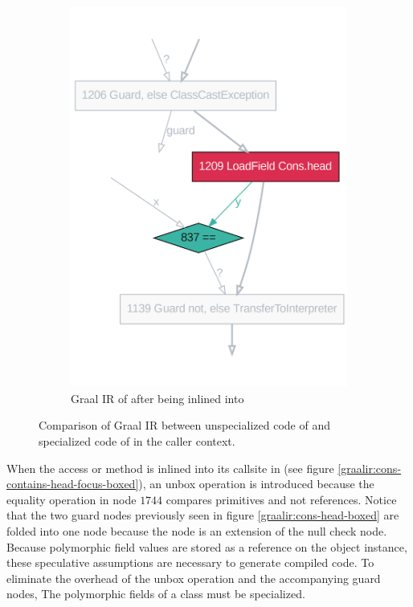 \begin{figure}[!htb]
\begin{subfigure}[b]{0.4\textwidth}
		\includegraphics[width=\textwidth]{figures/dot/List.contains.specialized.TruffleTier.png}
		\caption{Graal IR of  after being inlined into }
		\label{graalir:cons-contains-head-focus-specialized}
	\end{subfigure}
	\hfill
	\caption{Comparison of Graal IR between unspecialized code of  and specialized code of  in the caller context.}
\end{figure}

When the access or method  is inlined into its callsite in  (see figure \ref{graalir:cons-contains-head-focus-boxed}), an unbox operation is introduced because the equality operation in node $1744$ compares primitives and not references.
Notice that the two guard nodes previously seen in figure \ref{graalir:cons-head-boxed} are folded into one node because the  node is an extension of the null check node.
Because polymorphic field values are stored as a reference on the object instance, these speculative assumptions are necessary to generate compiled code.
To eliminate the overhead of the unbox operation and the accompanying guard nodes, The polymorphic fields of a class must be specialized.

